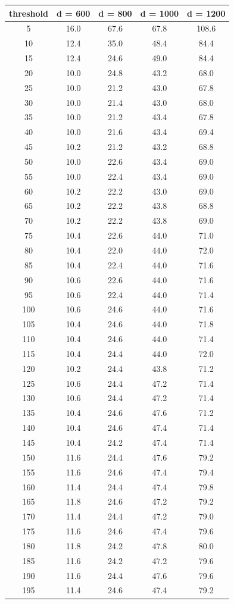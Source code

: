 \documentclass[12pt]{article}
\begin{document}
\pagebreak
\begin{table}[h]
\centering
\caption*{\textbf{Appendix A}: Run Times of Modified Strassen's for Various Thresholds and Dimensions}
{\setlength{\tabcolsep}{15pt}
\begin{longtable}{c|c|c|c|c}
threshold & d = 600 & d = 800 & d = 1000 & d = 1200 \\\hline
5 & 16.0 & 67.6 & 67.8 & 108.6\\
10 & 12.4 & 35.0 & 48.4 & 84.4\\
15 & 12.4 & 24.6 & 49.0 & 84.4\\
20 & 10.0 & 24.8 & 43.2 & 68.0\\
25 & 10.0 & 21.2 & 43.0 & 67.8\\
30 & 10.0 & 21.4 & 43.0 & 68.0\\
35 & 10.0 & 21.2 & 43.4 & 67.8\\
40 & 10.0 & 21.6 & 43.4 & 69.4\\
45 & 10.2 & 21.2 & 43.2 & 68.8\\
50 & 10.0 & 22.6 & 43.4 & 69.0\\
55 & 10.0 & 22.4 & 43.4 & 69.0\\
60 & 10.2 & 22.2 & 43.0 & 69.0\\
65 & 10.2 & 22.2 & 43.8 & 68.8\\
70 & 10.2 & 22.2 & 43.8 & 69.0\\
75 & 10.4 & 22.6 & 44.0 & 71.0\\
80 & 10.4 & 22.0 & 44.0 & 72.0\\
85 & 10.4 & 22.4 & 44.0 & 71.6\\
90 & 10.6 & 22.6 & 44.0 & 71.6\\
95 & 10.6 & 22.4 & 44.0 & 71.4\\
100 & 10.6 & 24.6 & 44.0 & 71.6\\
105 & 10.4 & 24.6 & 44.0 & 71.8\\
110 & 10.4 & 24.6 & 44.0 & 71.4\\
115 & 10.4 & 24.4 & 44.0 & 72.0\\
120 & 10.2 & 24.4 & 43.8 & 71.2\\
125 & 10.6 & 24.4 & 47.2 & 71.4\\
130 & 10.6 & 24.4 & 47.2 & 71.4\\
135 & 10.4 & 24.6 & 47.6 & 71.2\\
140 & 10.4 & 24.6 & 47.4 & 71.4\\
145 & 10.4 & 24.2 & 47.4 & 71.4\\
150 & 11.6 & 24.4 & 47.6 & 79.2\\
155 & 11.6 & 24.6 & 47.4 & 79.4\\
160 & 11.4 & 24.4 & 47.4 & 79.8\\
165 & 11.8 & 24.6 & 47.2 & 79.2\\
170 & 11.4 & 24.4 & 47.2 & 79.0\\
175 & 11.6 & 24.6 & 47.4 & 79.6\\
180 & 11.8 & 24.2 & 47.8 & 80.0\\
185 & 11.6 & 24.2 & 47.2 & 79.6\\
190 & 11.6 & 24.4 & 47.6 & 79.6\\
195 & 11.4 & 24.6 & 47.4 & 79.2\\
\end{longtable}}
\end{table}
\end{document}
